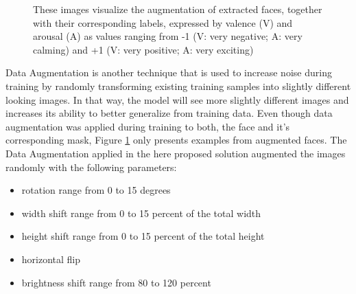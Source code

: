 \begin{figure}[htpb]
  \hfill
  \caption[Data Augmentation]{These images visualize the augmentation of extracted faces, together with their corresponding labels, expressed by valence (V) and arousal (A) as values ranging from -1 (V: very negative; A: very calming) and +1 (V: very positive; A: very exciting)}
  \label{fig:MethodologyDataAugmentation}
\end{figure}

Data Augmentation is another technique that is used to increase noise during training by randomly transforming existing training samples into slightly different looking images. In that way, the model will see more slightly different images and increases its ability to better generalize from training data. Even though data augmentation was applied during training to both, the face and it's corresponding mask, Figure \ref{fig:MethodologyDataAugmentation} only presents examples from augmented faces.
\newline\newline
The Data Augmentation applied in the here proposed solution augmented the images randomly with the following parameters:

\begin{itemize}
    \item rotation range from 0 to 15 degrees
    \item width shift range from 0 to 15 percent of the total width
    \item height shift range from 0 to 15 percent of the total height
    \item horizontal flip
    \item brightness shift range from 80 to 120 percent
\end{itemize}

